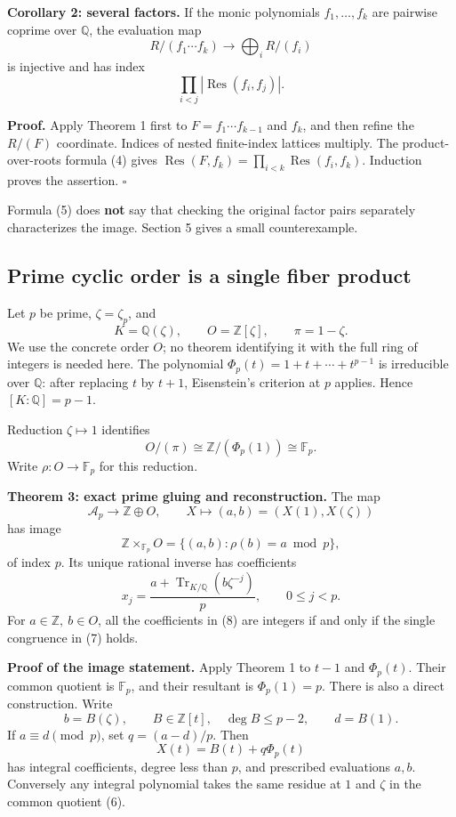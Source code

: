 \documentclass[
  11pt,
]{article}
\begin{document}
\textbf{Corollary 2: several factors.} If the monic polynomials
\(f_1,\ldots,f_k\) are pairwise coprime over \(\mathbb Q\), the
evaluation map \[
 R/(f_1\cdots f_k)\longrightarrow\bigoplus_i R/(f_i)
\] is injective and has index \[
 \prod_{i<j}|\operatorname{Res}(f_i,f_j)|.                  \tag{5}
\]

\textbf{Proof.} Apply Theorem 1 first to \(F=f_1\cdots f_{k-1}\) and
\(f_k\), and then refine the \(R/(F)\) coordinate. Indices of nested
finite-index lattices multiply. The product-over-roots formula (4) gives
\(\operatorname{Res}(F,f_k)=\prod_{i<k}\operatorname{Res}(f_i,f_k)\).
Induction proves the assertion. \(\square\)

Formula (5) does \textbf{not} say that checking the original factor
pairs separately characterizes the image. Section 5 gives a small
counterexample.

\subsection{Prime cyclic order is a single fiber
product}\label{prime-cyclic-order-is-a-single-fiber-product}

Let \(p\) be prime, \(\zeta=\zeta_p\), and \[
 K=\mathbb Q(\zeta),\qquad O=\mathbb Z[\zeta],\qquad
 \pi=1-\zeta.
\] We use the concrete order \(O\); no theorem identifying it with the
full ring of integers is needed here. The polynomial
\(\Phi_p(t)=1+t+\cdots+t^{p-1}\) is irreducible over \(\mathbb Q\):
after replacing \(t\) by \(t+1\), Eisenstein's criterion at \(p\)
applies. Hence \([K:\mathbb Q]=p-1\).

Reduction \(\zeta\mapsto1\) identifies \[
 O/(\pi)\cong\mathbb Z/(\Phi_p(1))\cong\mathbb F_p.          \tag{6}
\] Write \(\rho:O\to\mathbb F_p\) for this reduction.

\textbf{Theorem 3: exact prime gluing and reconstruction.} The map \[
 \mathcal A_p\longrightarrow\mathbb Z\oplus O,\qquad
 X\longmapsto(a,b)=(X(1),X(\zeta))
\] has image \[
 \mathbb Z\times_{\mathbb F_p}O
       =\{(a,b):\rho(b)=a\bmod p\},                         \tag{7}
\] of index \(p\). Its unique rational inverse has coefficients \[
 \boxed{\displaystyle
 x_j=\frac{a+\operatorname{Tr}_{K/\mathbb Q}
                  (b\zeta^{-j})}{p}},\qquad 0\le j<p.      \tag{8}
\] For \(a\in\mathbb Z,\ b\in O\), all the coefficients in (8) are
integers if and only if the single congruence in (7) holds.

\textbf{Proof of the image statement.} Apply Theorem 1 to \(t-1\) and
\(\Phi_p(t)\). Their common quotient is \(\mathbb F_p\), and their
resultant is \(\Phi_p(1)=p\). There is also a direct construction. Write
\[
 b=B(\zeta),\qquad B\in\mathbb Z[t],\quad\deg B\le p-2,
 \qquad d=B(1).
 \] If \(a\equiv d\pmod p\), set \(q=(a-d)/p\). Then \[
 X(t)=B(t)+q\Phi_p(t)                                    \tag{9}
\] has integral coefficients, degree less than \(p\), and prescribed
evaluations \(a,b\). Conversely any integral polynomial takes the same
residue at \(1\) and \(\zeta\) in the common quotient (6).
\end{document}
